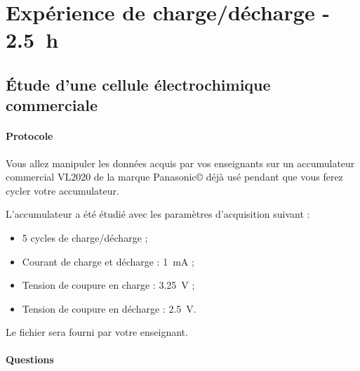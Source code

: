 \documentclass[twoside,a4paper,11pt,addpoints]{exam}%
\begin{document}
\section{Expérience de charge/décharge - \faClockO ~ \SI{2.5}{\hour}}

\subsection{\'{E}tude d'une cellule électrochimique commerciale}

\paragraph*{Protocole}

Vous allez manipuler les données acquis par vos enseignants sur un accumulateur commercial VL2020 de la marque Panasonic{\copyright} déjà usé pendant que vous ferez cycler votre accumulateur. 

L'accumulateur a été étudié avec les paramètres d'acquisition suivant :
\begin{itemize}
\item 5 cycles de charge/décharge ;
\item Courant de charge et décharge : \SI{1}{\milli\ampere} ;
\item Tension de coupure en charge : \SI{3.25}{\volt} ;
\item Tension de coupure en décharge : \SI{2.5}{\volt}.
\end{itemize}

Le fichier sera fourni par votre enseignant.

\paragraph*{Questions}
\end{document}
